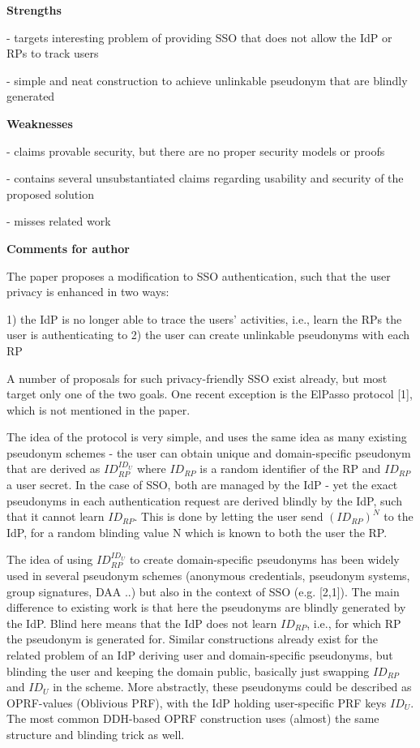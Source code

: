 \documentclass[letterpaper,onecolumn,10pt]{article}
\begin{document}
\vspace{1mm}\noindent\textbf{Strengths}


- targets interesting problem of providing SSO that does not allow the IdP or RPs to track users

- simple and neat construction to achieve unlinkable pseudonym that are blindly generated

\vspace{1mm}\noindent\textbf{Weaknesses}


- claims provable security, but there are no proper security models or proofs

- contains several unsubstantiated claims regarding usability and security of the proposed solution

- misses related work

\vspace{1mm}\noindent\textbf{Comments for author}

The paper proposes a modification to SSO authentication, such that the user privacy is enhanced in two ways:

1) the IdP is no longer able to trace the users' activities, i.e., learn the RPs the user is authenticating to
2) the user can create unlinkable pseudonyms with each RP

A number of proposals for such privacy-friendly SSO exist already, but most target only one of the two goals. One recent exception is the ElPasso protocol [1], which is not mentioned in the paper. 

The idea of the protocol is very simple, and uses the same idea as many existing pseudonym schemes - the user can obtain unique and domain-specific pseudonym that are derived as $ID_{RP} ^ {ID_U}$ where $ID_{RP}$ is a random identifier of the RP and $ID_{RP}$ a user secret. In the case of SSO, both are managed by the IdP - yet the exact pseudonyms in each authentication request are derived blindly by the IdP, such that it cannot learn $ID_{RP}$. This is done by letting the user send $(ID_{RP})^N$ to the IdP, for a random blinding value N which is known to both the user the RP.

The idea of using $ID_{RP}^{ID_U}$ to create domain-specific pseudonyms has been widely used in several pseudonym schemes (anonymous credentials, pseudonym systems, group signatures, DAA ..) but also in the context of SSO (e.g. [2,1]). The main difference to existing work is that here the pseudonyms are blindly generated by the IdP. Blind here means that the IdP does not learn $ID_{RP}$, i.e., for which RP the pseudonym is generated for. Similar constructions already exist for the related problem of an IdP deriving user and domain-specific pseudonyms, but blinding the user and keeping the domain public, basically just swapping $ID_{RP}$ and $ID_U$ in the scheme. More abstractly, these pseudonyms could be described as OPRF-values (Oblivious PRF), with the IdP holding user-specific PRF keys $ID_U$. The most common DDH-based OPRF construction uses (almost) the same structure and blinding trick as well.
\end{document}
